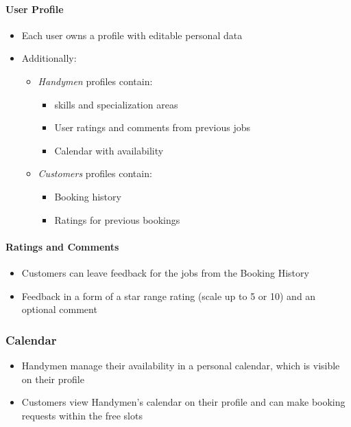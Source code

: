 \documentclass[11pt,a4paper]{article}
\begin{document}
\paragraph{User Profile}
\begin{itemize}
\item Each user owns a profile with editable personal data
\item Additionally:
  \begin{itemize}
  \item \textit{Handymen} profiles contain:
    \begin{itemize}
    \item skills and specialization areas
    \item User ratings and comments from previous jobs
    \item Calendar with availability
    \end{itemize}
  \item \textit{Customers} profiles contain:
    \begin{itemize}
    \item Booking history
    \item Ratings for previous bookings
    \end{itemize}
  \end{itemize}
\end{itemize}

\paragraph{Ratings and Comments}
\begin{itemize}
\item Customers can leave feedback for the jobs from the Booking History
\item Feedback in a form of a star range rating (scale up to 5 or 10) and an optional comment
\end{itemize}

\subsubsection{Calendar}
\begin{itemize}
\item Handymen manage their availability in a personal calendar, which is visible on their profile
\item Customers view Handymen's calendar on their profile and can make booking requests within the free slots
\end{itemize}
\end{document}
